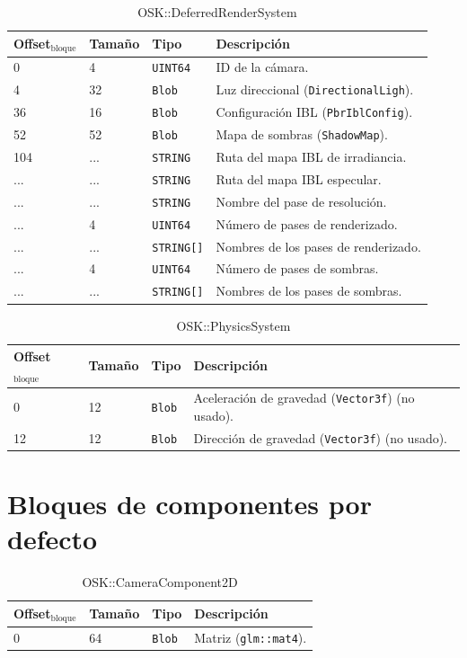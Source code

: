 \documentclass[12pt,a4paper]{article}
\begin{document}
\begin{table}[h]
\caption{OSK::DeferredRenderSystem}
\center
\begin{tabular}{llll}
\hline
Offset$_\text{bloque}$ & Tamaño & Tipo & Descripción \\ \hline
0 & 4 & \texttt{UINT64} & ID de la cámara. \\
4 & 32 & \texttt{Blob} & Luz direccional (\texttt{DirectionalLigh}). \\
36 & 16 & \texttt{Blob} & Configuración IBL (\texttt{PbrIblConfig}). \\
52 & 52 & \texttt{Blob} & Mapa de sombras (\texttt{ShadowMap}). \\
104 & ... & \texttt{STRING} & Ruta del mapa IBL de irradiancia. \\
... & ... & \texttt{STRING} & Ruta del mapa IBL especular. \\
... & ... & \texttt{STRING} & Nombre del pase de resolución. \\
... & 4 & \texttt{UINT64} & Número de pases de renderizado. \\
... & ... & \texttt{STRING[]} & Nombres de los pases de renderizado. \\
... & 4 & \texttt{UINT64} & Número de pases de sombras. \\
... & ... & \texttt{STRING[]} & Nombres de los pases de sombras. \\
\hline
\end{tabular}
\end{table}

\begin{table}[h]
\caption{OSK::PhysicsSystem}
\center
\begin{tabular}{llll}
\hline
Offset$_\text{bloque}$ & Tamaño & Tipo & Descripción \\ \hline
0 & 12 & \texttt{Blob} & Aceleración de gravedad (\texttt{Vector3f}) (no usado). \\
12 & 12 & \texttt{Blob} & Dirección de gravedad (\texttt{Vector3f}) (no usado). \\
\hline
\end{tabular}
\end{table}

\pagebreak
\section{Bloques de componentes por defecto}

\begin{table}[h]
\caption{OSK::CameraComponent2D}
\center
\begin{tabular}{llll}
\hline
Offset$_\text{bloque}$ & Tamaño & Tipo & Descripción \\ \hline
0 & 64 & \texttt{Blob} & Matriz (\texttt{glm::mat4}). \\
\hline
\end{tabular}
\end{table}
\end{document}
